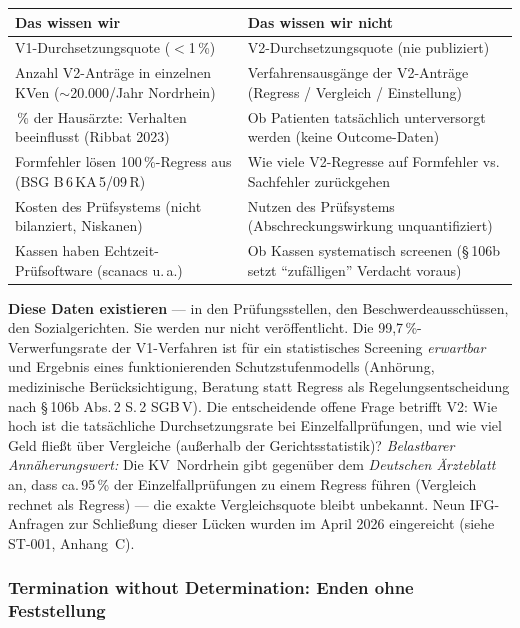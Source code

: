 \documentclass{umbruch-position}
\begin{document}
{\small
\begin{tabularx}{\textwidth}{X X}
\toprule
\textbf{Das wissen wir} & \textbf{Das wissen wir nicht} \\
\midrule
V1-Durchsetzungsquote ($<$1\,\%) & V2-Durchsetzungsquote (nie publiziert) \\
\addlinespace
Anzahl V2-Anträge in einzelnen KVen ($\sim$20.000/Jahr Nordrhein) & Verfahrensausgänge der V2-Anträge (Regress / Vergleich / Einstellung) \\
\addlinespace
47\,\% der Hausärzte: Verhalten beeinflusst (Ribbat 2023) & Ob Patienten tatsächlich unterversorgt werden (keine Outcome-Daten) \\
\addlinespace
Formfehler lösen 100\,\%-Regress aus (BSG B\,6\,KA\,5/09\,R) & Wie viele V2-Regresse auf Formfehler vs. Sachfehler zurückgehen \\
\addlinespace
Kosten des Prüfsystems (nicht bilanziert, Niskanen) & Nutzen des Prüfsystems (Abschreckungswirkung unquantifiziert) \\
\addlinespace
Kassen haben Echtzeit-Prüfsoftware (scanacs u.\,a.) & Ob Kassen systematisch screenen (\S\,106b setzt ``zufälligen'' Verdacht voraus) \\
\bottomrule
\end{tabularx}
}

\textbf{Diese Daten existieren} --- in den Prüfungsstellen, den Beschwerdeausschüssen, den Sozialgerichten. Sie werden nur nicht veröffentlicht. Die 99,7\,\%-Verwerfungsrate der V1-Verfahren ist für ein statistisches Screening \textit{erwartbar} und Ergebnis eines funktionierenden Schutzstufenmodells (Anhörung, medizinische Berücksichtigung, Beratung statt Regress als Regelungsentscheidung nach \S\,106b Abs.\,2 S.\,2 SGB\,V). Die entscheidende offene Frage betrifft V2: Wie hoch ist die tatsächliche Durchsetzungsrate bei Einzelfallprüfungen, und wie viel Geld fließt über Vergleiche (außerhalb der Gerichtsstatistik)? \emph{Belastbarer Annäherungswert:} Die KV~Nordrhein gibt gegenüber dem \emph{Deutschen Ärzteblatt} an, dass ca.\,95\,\% der Einzelfallprüfungen zu einem Regress führen (Vergleich rechnet als Regress) --- die exakte Vergleichsquote bleibt unbekannt. Neun IFG-Anfragen zur Schließung dieser Lücken wurden im April 2026 eingereicht (siehe ST-001, Anhang~C).

\subsubsection*{Termination without Determination: Enden ohne Feststellung}
\end{document}
